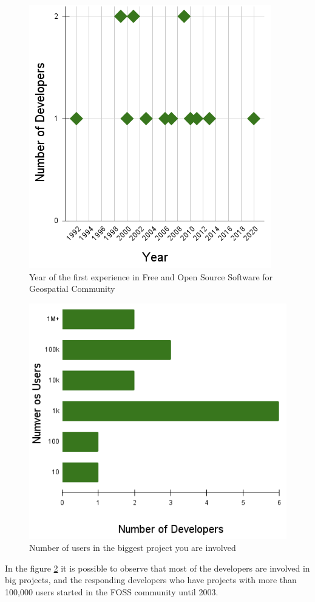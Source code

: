 \begin{figure}[]
     \centering
     \includegraphics[scale=0.7]{img/year.png}
     \caption{Year of the first experience in Free and Open Source Software for Geospatial Community}
     \label{fig:year}
\end{figure}


\begin{figure}[]
     \centering
     \includegraphics[scale=0.8]{img/users.png}
     \caption{ Number of users in the biggest project you are involved}
     \label{fig:users}
\end{figure}
In the figure \ref{fig:users} it is possible to observe that most of the developers are involved in big projects, and the responding developers who have projects with more than 100,000 users started in the FOSS community until 2003.

